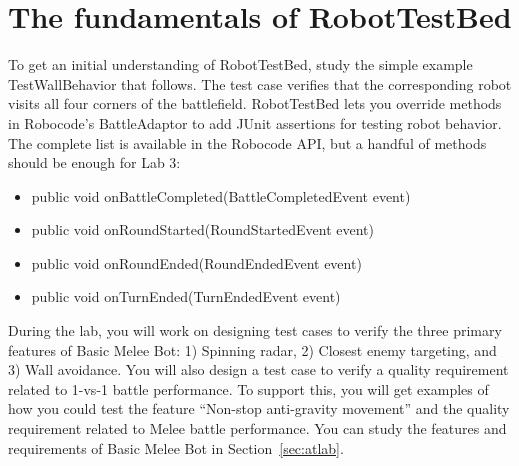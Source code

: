 \documentclass{scrreprt}
\begin{document}
\vspace{1em}
\vspace{1em}

\newpage

\section{The fundamentals of RobotTestBed}
To get an initial understanding of RobotTestBed, study the simple example TestWallBehavior that follows. The test case verifies that the corresponding robot visits all four corners of the battlefield. RobotTestBed lets you override methods in Robocode's BattleAdaptor to add JUnit assertions for testing robot behavior. The complete list is available in the Robocode API, but a handful of methods should be enough for Lab 3:
\begin{itemize}
\item public void onBattleCompleted(BattleCompletedEvent event)
\item public void onRoundStarted(RoundStartedEvent event)
\item public void onRoundEnded(RoundEndedEvent event)
\item public void onTurnEnded(TurnEndedEvent event)
\end{itemize}

During the lab, you will work on designing test cases to verify the three primary features of Basic Melee Bot: 1) Spinning radar, 2) Closest enemy targeting,  and 3) Wall avoidance. You will also design a test case to verify a quality requirement related to 1-vs-1 battle performance. To support this, you will get examples of how you could test the feature ``Non-stop anti-gravity movement'' and the quality requirement related to Melee battle performance. You can study the features and requirements of Basic Melee Bot in Section~\ref{sec:atlab}. 
\end{document}
